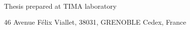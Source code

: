~\\


\centering
Thesis prepared at TIMA laboratory

46 Avenue F\'elix Viallet, 38031, GRENOBLE Cedex, France

\vspace{-4em}

